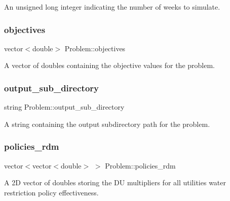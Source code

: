 An unsigned long integer indicating the number of weeks to simulate. 

\mbox{\label{classProblem_a72750ee8c8117f5ee9b190a359d6a60d}} 
\subsubsection{\texorpdfstring{objectives}{objectives}}
{\footnotesize\ttfamily vector$<$double$>$ Problem\+::objectives\hspace{0.3cm}{\ttfamily [protected]}}



A vector of doubles containing the objective values for the problem. 

\mbox{\label{classProblem_a43fa7720db839a1db318f4745997ae2d}} 
\subsubsection{\texorpdfstring{output\+\_\+sub\+\_\+directory}{output\_sub\_directory}}
{\footnotesize\ttfamily string Problem\+::output\+\_\+sub\+\_\+directory\hspace{0.3cm}{\ttfamily [protected]}}



A string containing the output subdirectory path for the problem. 

\mbox{\label{classProblem_a63d49161a5d6d98e26cd218d90a13bae}} 
\subsubsection{\texorpdfstring{policies\+\_\+rdm}{policies\_rdm}}
{\footnotesize\ttfamily vector$<$vector$<$double$>$ $>$ Problem\+::policies\+\_\+rdm\hspace{0.3cm}{\ttfamily [protected]}}



A 2D vector of doubles storing the DU multipliers for all utilities\textquotesingle{} water restriction policy effectiveness. 

